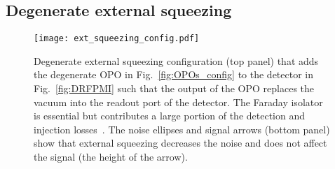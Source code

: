 
\subsection{Degenerate external squeezing}
\label{sec:external_squeezing}

\begin{figure}
	\centering
	\texttt{[image: ext\_squeezing\_config.pdf]}
	\caption{Degenerate external squeezing configuration (top panel) that adds the degenerate OPO in Fig.~\ref{fig:OPOs_config} to the detector in Fig.~\ref{fig:DRFPMI} such that the output of the OPO replaces the vacuum into the readout port of the detector. The Faraday isolator is essential but contributes a large portion  of the detection and injection losses~\cite{}. The noise ellipses and signal arrows (bottom panel) show that external squeezing decreases the noise and does not affect the signal (the height of the arrow).}
	\label{fig:extSqz_config}
\end{figure}



